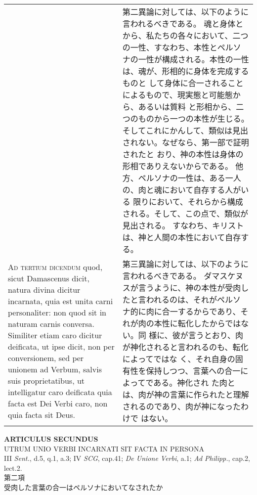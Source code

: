 \documentclass[10pt]{jsarticle} %
\begin{document}
\begin{longtable}{p{21em}p{21em}}
&

第二異論に対しては、以下のように言われるべきである。
魂と身体とから、私たちの各々において、二つの一性、すなわち、本性とペルソ
 ナの一性が構成される。本性の一性は、魂が、形相的に身体を完成するものと
 して身体に合一されることによるもので、現実態と可能態から、あるいは質料
 と形相から、二つのものから一つの本性が生じる。
そしてこれにかんして、類似は見出されない。なぜなら、第一部で証明されたと
 おり、神の本性は身体の形相でありえないからである。
他方、ペルソナの一性は、ある一人の、肉と魂において自存する人がいる
限りにおいて、それらから構成される。そして、この点で、類似が見出される。
 すなわち、キリストは、神と人間の本性において自存する。




\\



{\scshape Ad tertium dicendum} quod, sicut Damascenus dicit, natura divina dicitur
incarnata, quia est unita carni personaliter: non quod sit in naturam
carnis conversa. Similiter etiam caro dicitur deificata, ut ipse dicit,
non per conversionem, sed per unionem ad Verbum, salvis suis
proprietatibus, ut intelligatur caro deificata quia facta est Dei Verbi
caro, non quia facta sit Deus.


&


第三異論に対しては、以下のように言われるべきである。
ダマスケヌスが言うように、神の本性が受肉したと言われるのは、それがペルソ
 ナ的に肉に合一するからであり、それが肉の本性に転化したからではない。同
 様に、彼が言うとおり、肉が神化されると言われるのも、転化によってではな
 く、それ自身の固有性を保持しつつ、言葉への合一によってである。神化され
 た肉とは、肉が神の言葉に作られたと理解されるのであり、肉が神になったわけで
 はない。



\end{longtable}
\newpage






\begin{center}
 {\Large {\bf ARTICULUS SECUNDUS}}\\
 {\large UTRUM UNIO VERBI INCARNATI SIT FACTA IN PERSONA}\\
 {\footnotesize III {\itshape Sent.}, d.5, q.1, a.3; IV {\itshape SCG},
 cap.41; {\itshape De Unione Verbi}, a.1; {\itshape Ad Philipp.},
 cap.2, lect.2.}\\
 {\Large 第二項\\受肉した言葉の合一はペルソナにおいてなされたか}
\end{center}
\end{document}
